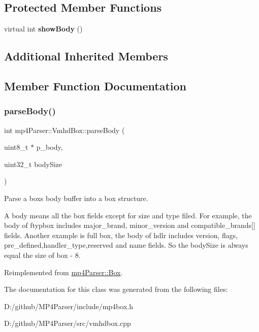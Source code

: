 \subsection*{Protected Member Functions}
\begin{DoxyCompactItemize}
\item 
\mbox{\label{classmp4_parser_1_1_vmhd_box_a5973d60d9eb41437ac94e41cb6d7bead}} 
virtual int {\bfseries show\+Body} ()
\end{DoxyCompactItemize}
\subsection*{Additional Inherited Members}


\subsection{Member Function Documentation}
\mbox{\label{classmp4_parser_1_1_vmhd_box_a3dbd2d4c86f22a16fe0e345fecad8fcb}} 
\subsubsection{\texorpdfstring{parseBody()}{parseBody()}}
{\footnotesize\ttfamily int mp4\+Parser\+::\+Vmhd\+Box\+::parse\+Body (\begin{DoxyParamCaption}\item[{uint8\+\_\+t $\ast$}]{p\+\_\+body,  }\item[{uint32\+\_\+t}]{body\+Size }\end{DoxyParamCaption})\hspace{0.3cm}{\ttfamily [virtual]}}



Parse a box\textquotesingle{}s body buffer into a box structure. 

A body means all the box fields except for size and type filed. For example, the body of ftypbox includes major\+\_\+brand, minor\+\_\+version and compatible\+\_\+brands\mbox{[}\mbox{]} fields. Another example is full box, the body of hdlr includes version, flags, pre\+\_\+defined,handler\+\_\+type,reserved and name fields. So the body\+Size is always equal the size of box -\/ 8. 

Reimplemented from \mbox{\hyperlink{classmp4_parser_1_1_box_a3dd0c084ac65bc77b69ac5ecaf796cb2}{mp4\+Parser\+::\+Box}}.



The documentation for this class was generated from the following files\+:\begin{DoxyCompactItemize}
\item 
D\+:/github/\+M\+P4\+Parser/include/mp4box.\+h\item 
D\+:/github/\+M\+P4\+Parser/src/vmhdbox.\+cpp\end{DoxyCompactItemize}
